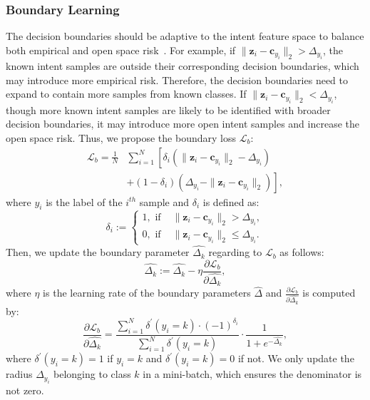 \documentclass[letterpaper]{article} %
\begin{document}
\subsubsection{Boundary Learning}
The decision boundaries should be adaptive to the intent feature space to balance both empirical and open space risk~\cite{Bendale2015}. For example, if $\|\boldsymbol{z}_{i}-\boldsymbol{c}_{y_{i}}\|_{2} > \Delta_{y_{i}}$, the known intent samples are outside their corresponding decision boundaries, which may introduce more empirical risk. Therefore, the decision boundaries need to expand to contain more samples from known classes. If $\|\boldsymbol{z}_{i}-\boldsymbol{c}_{y_{i}}\|_{2} < \Delta_{y_{i}}$, though more known intent samples are likely to be identified with broader decision boundaries, it may introduce more open intent samples and increase the open space risk. Thus, we propose the boundary loss $\mathcal{L}_{b}$:
\begin{equation}
\begin{split}
\mathcal{L}_{b}=\frac{1}{N}&\sum_{i=1}^{N}\left[\delta_{i}\left(\|\boldsymbol{z}_{i}-\boldsymbol{c}_{y_{i}}\|_{2}
-\Delta_{y_{i}}\right)\right.\\
&+\left. \left(1-\delta_{i}\right) \left(\Delta_{y_{i}}-\|\boldsymbol{z}_{i}-\boldsymbol{c}_{y_{i}}\|_{2}
\right)\right],
\end{split}
\end{equation}
where $y_{i}$ is the label of the $i^{th}$ sample and $\delta_{i}$ is defined as:
\begin{equation}
\delta_{i}:=\left\{\begin{array}{ll}1, \text { if } & \|\boldsymbol{z}_{i}-\boldsymbol{c}_{y_{i}}\|_{2} > \Delta_{y_{i}}, \\ 0, \text { if } & \|\boldsymbol{z}_{i}-\boldsymbol{c}_{y_{i}}\|_{2} \leq \Delta_{y_{i}}.\end{array}\right.
\end{equation}
Then, we update the boundary parameter $\widehat{\Delta_{k}}$ regarding to $\mathcal{L}_{b}$ as follows:
\begin{equation}
\widehat{\Delta_{k}} :=\widehat{\Delta_{k}}-\eta \frac{\partial \mathcal{L}_{b}}{\partial \widehat{\Delta_{k}}},
\end{equation}
where $\eta$ is the learning rate of the boundary parameters $\widehat{\Delta}$ and $\frac{\partial \mathcal{L}_{b}}{\partial \widehat{\Delta_{k}}}$ is computed by:
\begin{equation}
\frac{\partial \mathcal{L}_{b}}{\partial \widehat{\Delta_{k}}}=\frac{\sum_{i=1}^{N} \delta^{'}\left(y_{i}=k\right) \cdot(-1)^{\delta_{i}}}{\sum_{i=1}^{N} \delta^{'}\left(y_{i}=k\right)}\cdot \frac{1}{1+e^{-\widehat{\Delta_{k}}}},
\end{equation}
where $\delta^{'}(y_{i}=k)=1$ if $y_{i}=k$ and $\delta^{'}(y_{i}=k)=0$ if not. We only update the radius $\Delta_{y_{i}}$ belonging to class $k$ in a mini-batch, which ensures the denominator is not zero.
\end{document}
